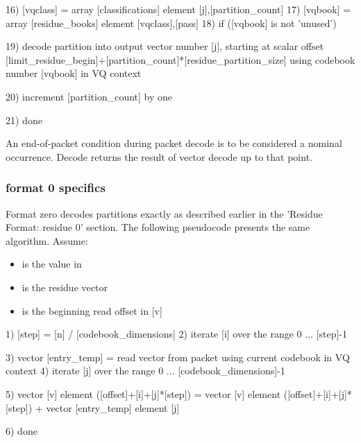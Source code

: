\begin{programlisting}
{{{{                           16) [vqclass] = array [classifications] element [j],[partition_count]
                           17) [vqbook] = array [residue_books] element [vqclass],[pass]
                           18) if ([vqbook] is not 'unused') {

                                19) decode partition into output vector number [j], starting at scalar
                                    offset [limit_residue_begin]+[partition_count]*[residue_partition_size] using
                                    codebook number [vqbook] in VQ context
                          }
                     }

                 20) increment [partition_count] by one

               }
          }
     }

 21) done

\end{programlisting}

An end-of-packet condition during packet decode is to be considered a
nominal occurrence.  Decode returns the result of vector decode up to
that point.



\subsubsection{format 0 specifics}

Format zero decodes partitions exactly as described earlier in the
'Residue Format: residue 0' section.  The following pseudocode
presents the same algorithm. Assume:

\begin{itemize}
\item  \varname{[n]} is the value in 
\item \varname{[v]} is the residue vector
\item \varname{[offset]} is the beginning read offset in [v]
\end{itemize}


\begin{programlisting}
 1) [step] = [n] / [codebook_dimensions]
 2) iterate [i] over the range 0 ... [step]-1 {

      3) vector [entry_temp] = read vector from packet using current codebook in VQ context
      4) iterate [j] over the range 0 ... [codebook_dimensions]-1 {

           5) vector [v] element ([offset]+[i]+[j]*[step]) =
	        vector [v] element ([offset]+[i]+[j]*[step]) +
                vector [entry_temp] element [j]

         }

    }

  6) done

\end{programlisting}



